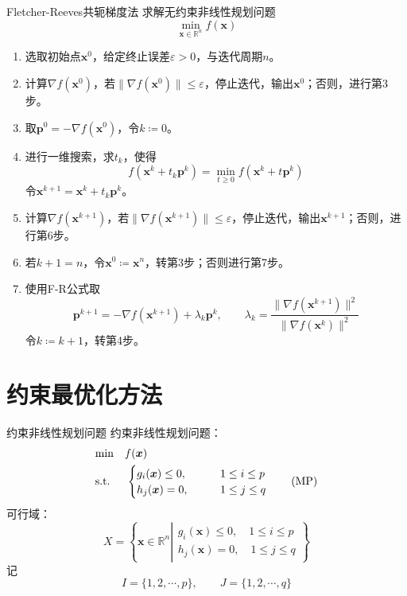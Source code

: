 \documentclass[lang = cn, scheme = chinese, thmcnt = section]{elegantbook}
\newcommand{\R}{\mathbb{R}}            %
\newcommand{\bs}{\boldsymbol}          %
\begin{document}
\begin{theorem}{Fletcher-Reeves共轭梯度法}
	求解无约束非线性规划问题
	$$
	\min_{\bs{x}\in\R^n} f(\bs{x})
	$$
	\begin{enumerate}
		\item 选取初始点$\bs{x}^0$，给定终止误差$\varepsilon>0$，与迭代周期$n$。
		\item 计算$\nabla f(\bs{x}^0)$，若$\|\nabla f(\bs{x}^0)\|\le\varepsilon$，停止迭代，输出$\bs{x}^0$；否则，进行第3步。
		\item 取$\bs{p}^0=-\nabla f(\bs{x}^0)$，令$k\coloneqq 0$。
		\item 进行一维搜索，求$t_k$，使得
		$$
		f(\bs{x}^k+t_k\bs{p}^k)
		=\min_{t\ge 0}f(\bs{x}^k+t\bs{p}^k)
		$$
		令$\bs{x}^{k+1}=\bs{x}^k+t_k\bs{p}^k$。
		\item 计算$\nabla f(\bs{x}^{k+1})$，若$\|\nabla f(\bs{x}^{k+1})\|\le\varepsilon$，停止迭代，输出$\bs{x}^{k+1}$；否则，进行第6步。
		\item 若$k+1=n$，令$\bs{x}^0\coloneqq \bs{x}^n$，转第3步；否则进行第7步。
		\item 使用F-R公式取
		$$
		\bs{p}^{k+1}=-\nabla f(\bs{x}^{k+1})+\lambda_k\bs{p}^k,\qquad 
		\lambda_k=\frac{\| \nabla f(\bs{x}^{k+1}) \|^2}{\| \nabla f(\bs{x}^{k}) \|^2}
		$$
		令$k\coloneqq k+1$，转第4步。
	\end{enumerate}
\end{theorem}

\section{约束最优化方法}

\begin{definition}{约束非线性规划问题}
	约束非线性规划问题：
	\begin{align*}\label{约束非线性规划问题}
		& \text{min}  \quad f(\bs{x})\\
		& \text{s.t.} \;\, \quad \begin{cases}
			g_i(\bs{x})\le 0,\qquad & 1\le i \le p\\
			h_j(\bs{x})=0,\qquad & 1\le j \le q
		\end{cases}\tag{$\text{MP}$}
	\end{align*}
	可行域：
	$$
	X=\left\{ 
	\bs{x}\in\R^n\left|
	\begin{aligned}
		g_i(\bs{x})\le 0,\quad 1\le i \le p\\
		h_j(\bs{x})=0,\quad 1\le j \le q
	\end{aligned}\right.
	\right\}
	$$
	记
	$$
	I=\{ 1,2,\cdots,p \},\qquad 
	J=\{ 1,2,\cdots,q \}
	$$
\end{definition}
\end{document}
